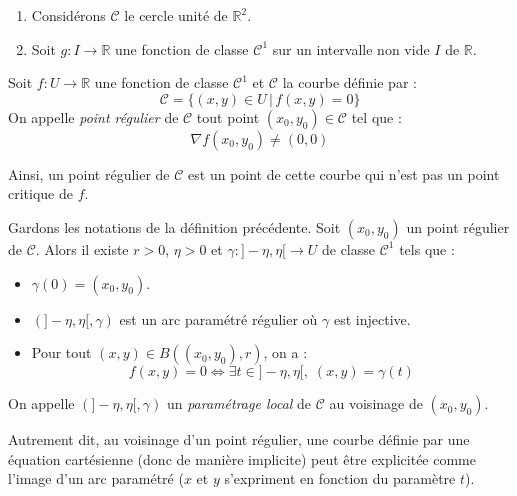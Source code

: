 \documentclass[french,11pt,twoside]{VcCours}
\begin{document}
\medskip

\begin{Exemples}{}
\begin{enumerate}
\item Considérons $\mathcal{C}$ le cercle unité de $\mathbb{R}^2$.

\vspace{5cm}
\item Soit $g : I \rightarrow \mathbb{R}$ une fonction de classe $\mathcal{C}^1$ sur un intervalle non vide $I$ de $\mathbb{R}$.

\vspace{5cm}
\end{enumerate}
\end{Exemples}

\begin{Definition}{} Soit $f : U \rightarrow \mathbb{R}$ une fonction de classe $\mathcal{C}^1$ et $\mathcal{C}$ la courbe définie par :
$$ \mathcal{C} = \lbrace (x,y) \in U \, \vert \, f(x,y)=0 \rbrace$$
On appelle \emph{point régulier} de $\mathcal{C}$ tout point $(x_0,y_0) \in \mathcal{C}$ tel que :
$$ \nabla f(x_0,y_0) \neq (0,0)$$
\end{Definition}

Ainsi, un point régulier de $\mathcal{C}$ est un point de cette courbe qui n'est pas un point critique de $f$.

\begin{Theoreme}{} Gardons les notations de la définition précédente. Soit $(x_0,y_0)$ un point régulier de $\mathcal{C}$. Alors il existe $r>0$, $\eta>0$ et $\gamma : ]- \eta, \eta[ \rightarrow U$ de classe $\mathcal{C}^1$ tels que :
\begin{itemize}
\item $\gamma(0)= (x_0,y_0)$.
\item $(]-\eta,\eta[, \gamma)$ est un arc paramétré régulier où $\gamma$ est injective.
\item Pour tout $(x,y) \in B((x_0,y_0),r)$, on a :
$$ f(x,y)=0 \Longleftrightarrow \exists t \in ]- \eta, \eta[, \; (x,y)=\gamma(t)$$
\end{itemize}
On appelle $(]-\eta,\eta[, \gamma)$ un \emph{paramétrage local} de $\mathcal{C}$ au voisinage de $(x_0,y_0)$.
\end{Theoreme}

\medskip

Autrement dit, au voisinage d'un point régulier, une courbe définie par une équation cartésienne (donc de manière implicite) peut être explicitée comme l'image d'un arc paramétré ($x$ et $y$ s'expriment en fonction du paramètre $t$).
\end{document}
